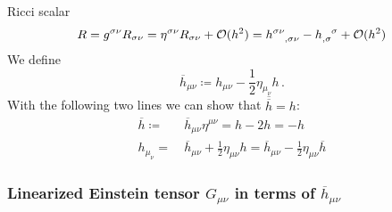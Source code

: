 Ricci scalar
\begin{equation}
    R = g^{\sigma\nu}R_{\sigma\nu} = \eta^{\sigma\nu}R_{\sigma\nu} + \landauO(h^2)
    = \tensor{h}{^\sigma^\nu_,_\sigma_\nu} - \tensor{h}{_,_\sigma^\sigma} + \landauO(h^2)
\end{equation}
We define
\begin{equation}
    \overline{h}_{\mu\nu} \coloneqq h_{\mu\nu} - \frac{1}{2} \eta_{\mu_\nu}h\,.
\end{equation}
With the following two lines we can show that $\overline{\overline{h}} = h$:
\begin{align}
    \overline{h} \coloneqq &\ \overline{h}_{\mu\nu}\eta^{\mu\nu} = h - 2h = -h \\
    h_{\mu_\nu} =&\ \overline{h}_{\mu\nu} + \frac{1}{2} \eta_{\mu\nu}h = \overline{h}_{\mu\nu} - \frac{1}{2} \eta_{\mu\nu}\overline{h}
\end{align}

\subsubsection{Linearized Einstein tensor \texorpdfstring{$G_{\mu\nu}$}{Gmunu} in terms of \texorpdfstring{$\overline{h}_{\mu\nu}$}{hbarmunu}}

